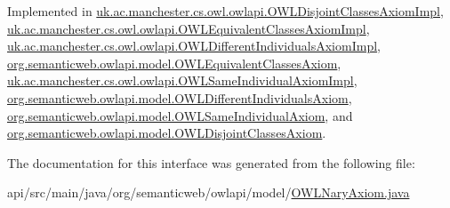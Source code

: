 Implemented in \hyperlink{classuk_1_1ac_1_1manchester_1_1cs_1_1owl_1_1owlapi_1_1_o_w_l_disjoint_classes_axiom_impl_ae60f0eaa94f3603622cdf1c0279659b4}{uk.\-ac.\-manchester.\-cs.\-owl.\-owlapi.\-O\-W\-L\-Disjoint\-Classes\-Axiom\-Impl}, \hyperlink{classuk_1_1ac_1_1manchester_1_1cs_1_1owl_1_1owlapi_1_1_o_w_l_equivalent_classes_axiom_impl_a7efa95b722664891d01a50a683ba06f4}{uk.\-ac.\-manchester.\-cs.\-owl.\-owlapi.\-O\-W\-L\-Equivalent\-Classes\-Axiom\-Impl}, \hyperlink{classuk_1_1ac_1_1manchester_1_1cs_1_1owl_1_1owlapi_1_1_o_w_l_different_individuals_axiom_impl_a30c0cf378a89406a88705accb9be92fe}{uk.\-ac.\-manchester.\-cs.\-owl.\-owlapi.\-O\-W\-L\-Different\-Individuals\-Axiom\-Impl}, \hyperlink{interfaceorg_1_1semanticweb_1_1owlapi_1_1model_1_1_o_w_l_equivalent_classes_axiom_aeecc3f5b3c8bcd0dd2a2244e008fdc83}{org.\-semanticweb.\-owlapi.\-model.\-O\-W\-L\-Equivalent\-Classes\-Axiom}, \hyperlink{classuk_1_1ac_1_1manchester_1_1cs_1_1owl_1_1owlapi_1_1_o_w_l_same_individual_axiom_impl_a95535f41a89d3ffd519d1a8fda84c142}{uk.\-ac.\-manchester.\-cs.\-owl.\-owlapi.\-O\-W\-L\-Same\-Individual\-Axiom\-Impl}, \hyperlink{interfaceorg_1_1semanticweb_1_1owlapi_1_1model_1_1_o_w_l_different_individuals_axiom_a3da6243cdd409b833369dc4ee0b5ec4c}{org.\-semanticweb.\-owlapi.\-model.\-O\-W\-L\-Different\-Individuals\-Axiom}, \hyperlink{interfaceorg_1_1semanticweb_1_1owlapi_1_1model_1_1_o_w_l_same_individual_axiom_a94d61d9207f591efcf02df75357a88ef}{org.\-semanticweb.\-owlapi.\-model.\-O\-W\-L\-Same\-Individual\-Axiom}, and \hyperlink{interfaceorg_1_1semanticweb_1_1owlapi_1_1model_1_1_o_w_l_disjoint_classes_axiom_af81486f9bade4b58d861a8f1420f53cf}{org.\-semanticweb.\-owlapi.\-model.\-O\-W\-L\-Disjoint\-Classes\-Axiom}.



The documentation for this interface was generated from the following file\-:\begin{DoxyCompactItemize}
\item 
api/src/main/java/org/semanticweb/owlapi/model/\hyperlink{_o_w_l_nary_axiom_8java}{O\-W\-L\-Nary\-Axiom.\-java}\end{DoxyCompactItemize}
